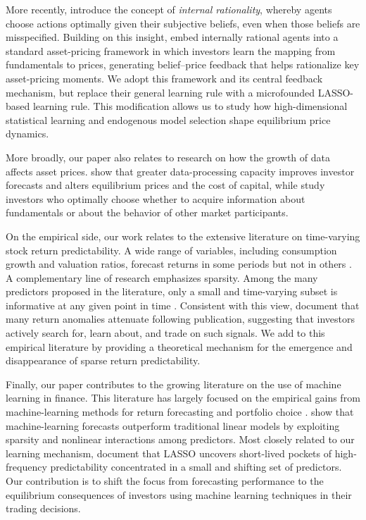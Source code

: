 \documentclass[11pt]{article}
\begin{document}
More recently, \citet{adam2011internal} introduce the concept of \textit{internal rationality}, whereby agents choose actions optimally given their subjective beliefs, even when those beliefs are misspecified. 
Building on this insight, \citet{Adam2016} embed internally rational agents into a standard asset-pricing framework in which investors learn the mapping from fundamentals to prices, generating belief--price feedback that helps rationalize key asset-pricing moments. 
We adopt this framework and its central feedback mechanism, but replace their general learning rule with a microfounded LASSO-based learning rule. 
This modification allows us to study how high-dimensional statistical learning and endogenous model selection shape equilibrium price dynamics.

More broadly, our paper also relates to research on how the growth of data affects asset prices. 
\citet{begenau2018big} show that greater data-processing capacity improves investor forecasts and alters equilibrium prices and the cost of capital, while \citet{farboodi2020long} study investors who optimally choose whether to acquire information about fundamentals or about the behavior of other market participants.

On the empirical side, our work relates to the extensive literature on time-varying stock return predictability. 
A wide range of variables, including consumption growth and valuation ratios, forecast returns in some periods but not in others \citep{AngBekaert2007RFS,GoyalWelch2003MS,LettauLudvigson2001JF}. 
A complementary line of research emphasizes sparsity.
Among the many predictors proposed in the literature, only a small and time-varying subset is informative at any given point in time \citep{kozak2020shrinking,freyberger2020dissecting}. 
Consistent with this view, \citet{Mclean2016} document that many return anomalies attenuate following publication, suggesting that investors actively search for, learn about, and trade on such signals.
We add to this empirical literature by providing a theoretical mechanism for the emergence and disappearance  of sparse return predictability.

Finally, our paper contributes to the growing literature on the use of machine learning in finance. 
This literature has largely focused on the empirical gains from machine-learning methods for return forecasting and portfolio choice \citep{Feng2020}. 
\citet{Gu2020} show that machine-learning forecasts outperform traditional linear models by exploiting sparsity and nonlinear interactions among predictors. 
Most closely related to our learning mechanism, \citet{Chinco2019} document that LASSO uncovers short-lived pockets of high-frequency predictability concentrated in a small and shifting set of predictors. 
Our contribution is to shift the focus from forecasting performance to the equilibrium consequences of investors using machine learning techniques in their trading decisions.
\end{document}
